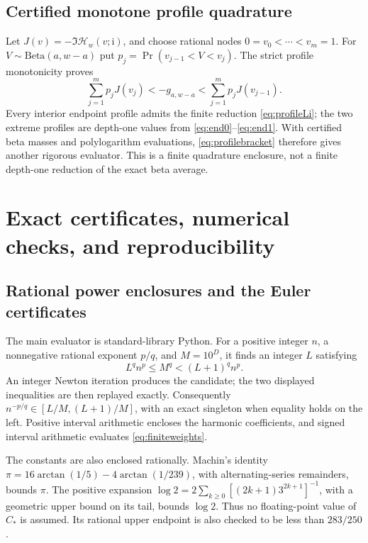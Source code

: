 \documentclass[11pt]{article}
\numberwithin{equation}{section}
\theoremstyle{definition}\newtheorem{definition}[theorem]{Definition}
\theoremstyle{remark}\newtheorem{remark}[theorem]{Remark}
\newcommand{\ii}{\mathrm i}
\newcommand{\HH}{\mathcal H}
\newcommand{\CC}{C_*}
\begin{document}
\subsection{Certified monotone profile quadrature}
Let $J(v)=-\Im\HH_w(v;\ii)$, and choose rational nodes
$0=v_0<\cdots<v_m=1$. For $V\sim\mathrm{Beta}(a,w-a)$ put
$p_j=\Pr(v_{j-1}<V<v_j)$. The strict profile monotonicity proves
\begin{equation}\label{eq:profilebracket}
 \sum_{j=1}^m p_jJ(v_j)
 <-g_{a,w-a}
 <\sum_{j=1}^m p_jJ(v_{j-1}).
\end{equation}
Every interior endpoint profile admits the finite reduction
\eqref{eq:profileLi}; the two extreme profiles are depth-one values
from \eqref{eq:end0}--\eqref{eq:end1}. With certified beta masses and
polylogarithm evaluations, \eqref{eq:profilebracket} therefore gives
another rigorous evaluator. This is a finite quadrature enclosure,
not a finite depth-one reduction of the exact beta average.

\section{Exact certificates, numerical checks, and reproducibility}
\label{sec:verification}

\subsection{Rational power enclosures and the Euler certificates}
The main evaluator is standard-library Python. For a positive integer
$n$, a nonnegative rational exponent $p/q$, and $M=10^D$, it finds an
integer $L$ satisfying
\begin{equation}\label{eq:integerroot}
 L^q n^p\le M^q<(L+1)^q n^p.
\end{equation}
An integer Newton iteration produces the candidate; the two displayed
inequalities are then replayed exactly. Consequently
$n^{-p/q}\in[L/M,(L+1)/M]$, with an exact singleton when equality
holds on the left. Positive interval arithmetic encloses the harmonic
coefficients, and signed interval arithmetic evaluates
\eqref{eq:finiteweights}.

The constants are also enclosed rationally. Machin's identity
$\pi=16\arctan(1/5)-4\arctan(1/239)$, with alternating-series
remainders, bounds $\pi$. The positive expansion
$\log2=2\sum_{k\ge0}[(2k+1)3^{2k+1}]^{-1}$, with a geometric upper
bound on its tail, bounds $\log2$. Thus no floating-point value of
$\CC$ is assumed. Its rational upper endpoint is also checked to be
less than $283/250$.
\end{document}
